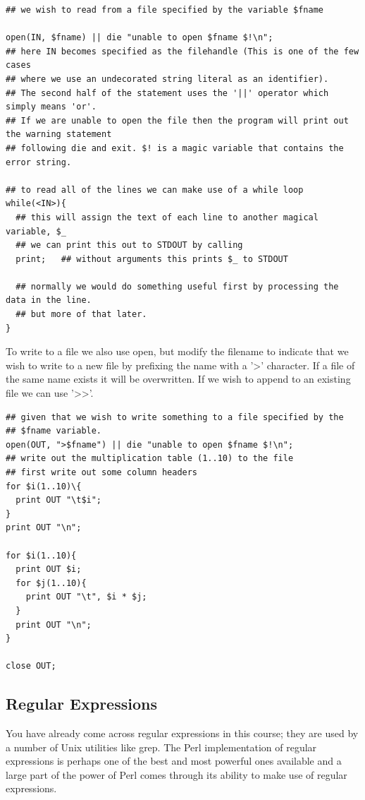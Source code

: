 \documentclass[11pt]{article}
\begin{document}
\begin{verbatim}
## we wish to read from a file specified by the variable $fname

open(IN, $fname) || die "unable to open $fname $!\n";
## here IN becomes specified as the filehandle (This is one of the few cases
## where we use an undecorated string literal as an identifier).
## The second half of the statement uses the '||' operator which simply means 'or'.
## If we are unable to open the file then the program will print out the warning statement
## following die and exit. $! is a magic variable that contains the error string.

## to read all of the lines we can make use of a while loop
while(<IN>){
  ## this will assign the text of each line to another magical variable, $_
  ## we can print this out to STDOUT by calling
  print;   ## without arguments this prints $_ to STDOUT

  ## normally we would do something useful first by processing the data in the line.
  ## but more of that later.
}
\end{verbatim}



To write to a file we also use open, but modify the filename to indicate
that we wish to write to a new file by prefixing the name with a '>'
character. If a file of the same name exists it will be overwritten. If
we wish to append to an existing file we can use '>>'.

\begin{verbatim}
## given that we wish to write something to a file specified by the
## $fname variable.
open(OUT, ">$fname") || die "unable to open $fname $!\n";
## write out the multiplication table (1..10) to the file
## first write out some column headers
for $i(1..10)\{
  print OUT "\t$i";
}
print OUT "\n";

for $i(1..10){
  print OUT $i;
  for $j(1..10){
    print OUT "\t", $i * $j;
  }
  print OUT "\n";
}

close OUT;
\end{verbatim}

\subsection{Regular Expressions}
\label{sec:orgheadline31}

You have already come across regular expressions in this course; they
are used by a number of Unix utilities like grep. The Perl
implementation of regular expressions is perhaps one of the best and
most powerful ones available and a large part of the power of Perl comes
through its ability to make use of regular expressions.
\end{document}
